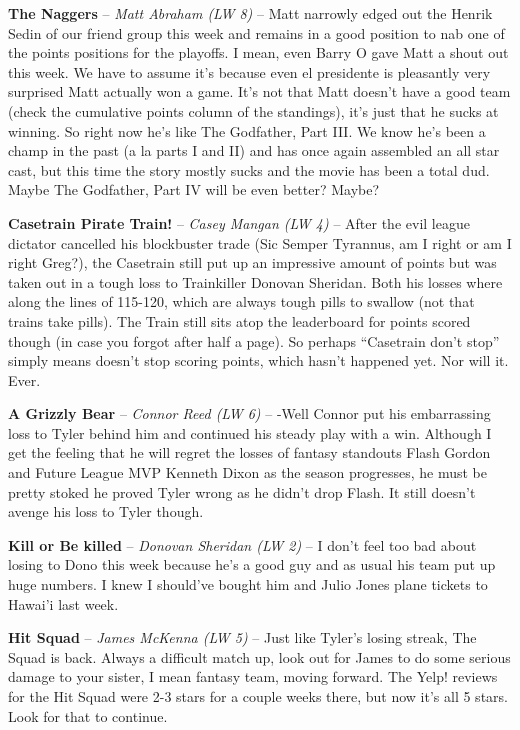 \documentclass[11pt,letterpaper]{article}
\begin{document}
\begin{etaremune}
\item \textbf{The Naggers} -- \textit{Matt Abraham (LW 8)} -- Matt narrowly edged out the Henrik Sedin of our friend group this week and remains in a good position to nab one of the points positions for the playoffs. I mean, even Barry O gave Matt a shout out this week. We have to assume it's because even el presidente is pleasantly very surprised Matt actually won a game. It's not that Matt doesn't have a good team (check the cumulative points column of the standings), it's just that he sucks at winning. So right now he's like The Godfather, Part III. We know he's been a champ in the past (a la parts I and II) and has once again assembled an all star cast, but this time the story mostly sucks and the movie has been a total dud. Maybe The Godfather, Part IV will be even better? Maybe? 
\item \textbf{Casetrain Pirate Train!} -- \textit{Casey Mangan (LW 4)} -- After the evil league dictator cancelled his blockbuster trade (Sic Semper Tyrannus, am I right or am I right Greg?), the Casetrain still put up an impressive amount of points but was taken out in a tough loss to Trainkiller Donovan Sheridan. Both his losses where along the lines of 115-120, which are always tough pills to swallow (not that trains take pills). The Train still sits atop the leaderboard for points scored though (in case you forgot after half a page). So perhaps “Casetrain don't stop” simply means doesn't stop scoring points, which hasn't happened yet. Nor will it. Ever.
\item \textbf{A Grizzly Bear} -- \textit{Connor Reed (LW 6)} -- -Well Connor put his embarrassing loss to Tyler behind him and continued his steady play with a win. Although I get the feeling that he will regret the losses of fantasy standouts Flash Gordon and Future League MVP Kenneth Dixon as the season progresses, he must be pretty stoked he proved Tyler wrong as he didn't drop Flash. It still doesn't avenge his loss to Tyler though.
\item \textbf{Kill or Be killed} -- \textit{Donovan Sheridan (LW 2)} -- I don't feel too bad about losing to Dono this week because he's a good guy and as usual his team put up huge numbers. I knew I should've bought him and Julio Jones plane tickets to Hawai'i last week. 
\item \textbf{Hit Squad} -- \textit{James McKenna (LW 5)} -- Just like Tyler's losing streak, The Squad is back. Always a difficult match up, look out for James to do some serious damage to your sister, I mean fantasy team, moving forward. The Yelp! reviews for the Hit Squad were 2-3 stars for a couple weeks there, but now it's all 5 stars. Look for that to continue. 

\end{etaremune}
\end{document}
